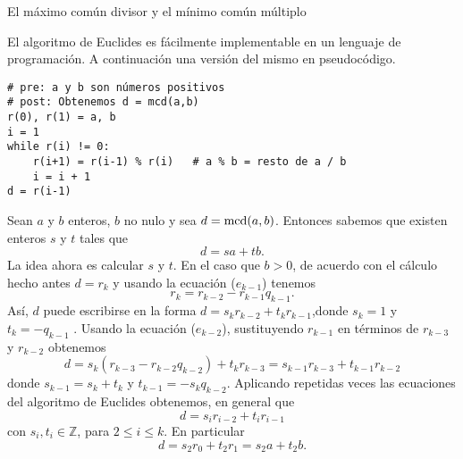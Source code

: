 \begin{section}{El máximo común divisor y el mínimo común
múltiplo}
\begin{observacion}[*] El algoritmo de Euclides es fácilmente implementable en un lenguaje de programación. A continuación una versión del mismo en pseudocódigo. 

\begin{minipage}{200pt}
\begin{small}
\begin{verbatim}
# pre: a y b son números positivos
# post: Obtenemos d = mcd(a,b)
r(0), r(1) = a, b
i = 1 
while r(i) != 0:
    r(i+1) = r(i-1) % r(i)   # a % b = resto de a / b
    i = i + 1
d = r(i-1)
\end{verbatim}
\end{small}
\end{minipage}


\end{observacion}



Sean $a$ y $b$ enteros, $b$ no nulo y sea $d=\operatorname{mcd}(a,b)$. Entonces sabemos que existen enteros $s$ y $t$ tales que
$$
d=sa+tb.
$$
La idea ahora es calcular $s$ y $t$. En el caso que $b >0$, de acuerdo con el cálculo hecho antes $d=r_{k}$ y usando la  ecuación ($e_{k-1}$) tenemos
$$
r_{k}=r_{k-2} -r_{k-1}q_{k-1}.
$$
As{í}, $d$ puede escribirse en la forma $ d = s_{k}r_{k-2} +t_{k}r_{k-1}$,donde $s_{k}=1$ y $t_{k}=-q_{k-1}$ . Usando la ecuación  ($e_{k-2}$), sustituyendo $r_{k-1}$ en términos de $r_{k-3}$ y $r_{k-2}$ obtenemos
$$
d= s_{k}(r_{k-3}-r_{k-2}q_{k-2}) + t_{k}r_{k-3} =  s_{k-1}r_{k-3} +t_{k-1}r_{k-2}
$$
donde $s_{k-1} = s_{k} + t_{k} $ y $t_{k-1}= -s_{k}q_{k-2}$.  Aplicando  repetidas veces las ecuaciones del algoritmo de Euclides obtenemos, en general que 
$$
d =  s_{i}r_{i-2} +t_{i}r_{i-1}
$$
con  $s_{i}, t_{i} \in \mathbb Z$, para $2 \le i \le k$. En particular 
$$
d =  s_{2}r_{0} +t_{2}r_{1} = s_{2}a +t_{2}b.
$$




\end{section}
